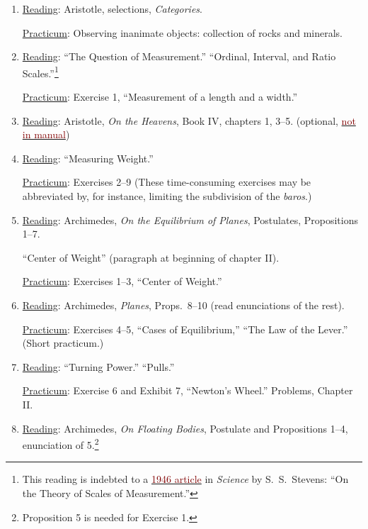 \documentclass{article}
\newcommand{\rd}{\uline{Reading}}
\newcommand{\pc}{\uline{Practicum}}
\begin{document}
\begin{enumerate}
\item \rd:  Aristotle, selections, \emph{Categories}.\label{cat}

\pc: Observing inanimate objects: collection of rocks and minerals.

\item \rd:  ``The Question of Measurement.'' ``Ordinal, Interval, and Ratio Scales.''\footnote{This reading is indebted to a \href{https://sjca.sharepoint.com/:b:/r/sites/Departments/Faculty/Documents/Annapolis/Freshman\%20Lab/Schedule\%20and\%20files/Stevens_TheoryScalesMeasurement_1946.pdf?csf=1&web=1&e=jRLsyL}{\textcolor{Maroon}{1946 article}} in \emph{Science} by S.\ S.\ Stevens: ``On the Theory of Scales of Measurement.''}  

	\pc: Exercise 1, ``Measurement of a length and a width.''
	
	\item \rd: Aristotle, \emph{On the Heavens}, Book IV, chapters 1, 3--5. (optional, \href{https://sjca.sharepoint.com/:b:/r/sites/Departments/Faculty/Documents/Annapolis/Freshman\%20Lab/Schedule\%20and\%20files/Arist_On_Heavens.pdf?csf=1&web=1&e=9RDPg3}{\textcolor{Maroon}{not in manual}})

\item \rd:  ``Measuring Weight.''

	\pc: Exercises 2--9 (These time-consuming exercises may be abbreviated by, for instance, limiting the subdivision of the \emph{baros}.)

	\item \rd: Archimedes, \emph{On the Equilibrium of Planes}, Postulates, Propositions 1--7.
	 
	``Center of Weight'' (paragraph at beginning of chapter II). 

	\pc: Exercises 1--3, ``Center of Weight.''

\item \rd:  Archimedes, \emph{Planes}, Props.\ 8--10 (read enunciations of the rest). 

\pc: Exercises 4--5, ``Cases of Equilibrium,'' ``The Law of the Lever.'' (Short practicum.) 

\item \rd:  ``Turning Power.'' ``Pulls.'' 

	\pc: Exercise 6 and Exhibit 7, ``Newton’s Wheel.'' Problems, Chapter II.

\item \rd:   Archimedes, \emph{On Floating Bodies}, Postulate and
	Propositions 1--4, enunciation of 5.\footnote{Proposition 5 is needed for Exercise 1.} 


\end{enumerate}
\end{document}
